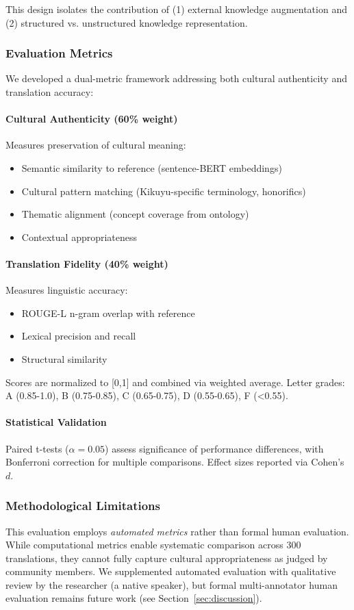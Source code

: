 This design isolates the contribution of (1) external knowledge augmentation and (2) structured vs. unstructured knowledge representation.

\subsubsection{Evaluation Metrics}
\label{subsec:evaluation_metrics}

We developed a dual-metric framework addressing both cultural authenticity and translation accuracy:

\paragraph{Cultural Authenticity (60\% weight)} Measures preservation of cultural meaning:
\begin{itemize}
    \item Semantic similarity to reference (sentence-BERT embeddings)
    \item Cultural pattern matching (Kikuyu-specific terminology, honorifics)
    \item Thematic alignment (concept coverage from ontology)
    \item Contextual appropriateness
\end{itemize}

\paragraph{Translation Fidelity (40\% weight)} Measures linguistic accuracy:
\begin{itemize}
    \item ROUGE-L n-gram overlap with reference
    \item Lexical precision and recall
    \item Structural similarity
\end{itemize}

Scores are normalized to [0,1] and combined via weighted average. Letter grades: A (0.85-1.0), B (0.75-0.85), C (0.65-0.75), D (0.55-0.65), F (<0.55).

\paragraph{Statistical Validation} Paired t-tests ($\alpha = 0.05$) assess significance of performance differences, with Bonferroni correction for multiple comparisons. Effect sizes reported via Cohen's $d$.

\subsubsection{Methodological Limitations}

This evaluation employs \emph{automated metrics} rather than formal human evaluation. While computational metrics enable systematic comparison across 300 translations, they cannot fully capture cultural appropriateness as judged by community members. We supplemented automated evaluation with qualitative review by the researcher (a native speaker), but formal multi-annotator human evaluation remains future work (see Section~\ref{sec:discussion}).
